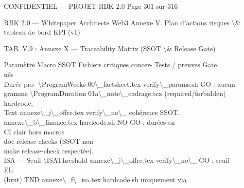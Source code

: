 \documentclass[12pt,landscape,a4paper]{article}
\newenvironment{confidential}
{\begin{tcolorbox}[
    colback=rbkred!5!white,
    colframe=rbkred!75!black,
    title=CONFIDENTIEL,
    fonttitle=\bfseries\color{white},
    coltitle=rbkred!75!black,
    breakable,
    enhanced,
    frame hidden,
    borderline west={2pt}{0pt}{rbkred!75!black}
]}
{\end{tcolorbox}}
\begin{document}
\begin{confidential}CONFIDENTIEL — PROJET RBK 2.0                                                               Page 301 sur 316\end{confidential}
RBK 2.0 — Whitepaper Architecte Web3                                              Annexe V. Plan d’actions risques \textbackslash{}& tableau de bord KPI (v1)\\
\vspace{0.5em}
\vspace{0.5em}
\begin{center}\begin{tabular}TAB. V.9 : Annexe X — Traceability Matrix (SSOT \textbackslash{}& Release Gate)\end{tabular}\end{center}
\vspace{0.5em}
Paramètre     Macro SSOT      Fichiers critiques concer- Tests / preuves        Gate\\
nés\\
Durée pro-    \textbackslash{}ProgramWeeks   00\textbackslash{}_factsheet.tex           verify\textbackslash{}_params.sh   GO : aucun\\
gramme        \textbackslash{}ProgramDuration 01a\textbackslash{}_note\textbackslash{}_cadrage.tex      (required/forbidden)\\
hardcode,\\
Text             annexe\textbackslash{}_j\textbackslash{}_offre.tex        verify\textbackslash{}_no\textbackslash{}_         cohérence SSOT.\\
annexe\textbackslash{}_b\textbackslash{}_finance.tex       hardcode.sh        NO-GO : durées en\\
CI                 clair hors macros\\
doc-release-checks (SSOT non\\
make release-check respectée).\\
ISA — Seuil    \textbackslash{}ISAThreshold   annexe\textbackslash{}_j\textbackslash{}_offre.tex         verify\textbackslash{}_no\textbackslash{}_             GO : seuil\\
\vspace{0.5em}
\vspace{0.5em}
\vspace{0.5em}
\vspace{0.5em}
EL\\
(brut)         TND             annexe\textbackslash{}_f\textbackslash{}_isa.tex           hardcode.sh            uniquement via\\
\end{document}
